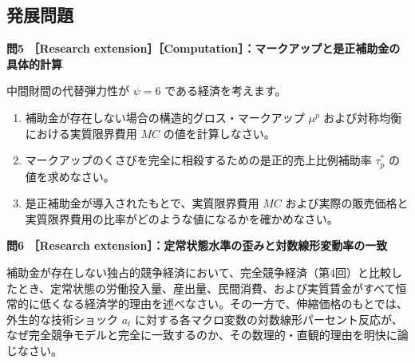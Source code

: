 \documentclass[
  japanese,
  lualatex,
  ja=standard,
  12pt,
  a4paper]{ltjsarticle}
\providecommand{\tightlist}{%
  \setlength{\itemsep}{0pt}\setlength{\parskip}{0pt}}
\begin{document}
\subsection{発展問題}\label{ux767aux5c55ux554fux984c}

\textbf{問5 ［Research
extension］［Computation］：マークアップと是正補助金の具体的計算}

中間財間の代替弾力性が \(\psi = 6\) である経済を考えます。

\begin{enumerate}
\def\labelenumi{\arabic{enumi}.}
\tightlist
\item
  補助金が存在しない場合の構造的グロス・マークアップ \(\mu^p\)
  および対称均衡における実質限界費用 \(MC\) の値を計算しなさい。
\item
  マークアップのくさびを完全に相殺するための是正的売上比例補助率
  \(\tau_p^*\) の値を求めなさい。
\item
  是正補助金が導入されたもとで、実質限界費用 \(MC\)
  および実際の販売価格と実質限界費用の比率がどのような値になるかを確かめなさい。
\end{enumerate}

\textbf{問6 ［Research
extension］：定常状態水準の歪みと対数線形変動率の一致}

補助金が存在しない独占的競争経済において、完全競争経済（第4回）と比較したとき、定常状態の労働投入量、産出量、民間消費、および実質賃金がすべて恒常的に低くなる経済学的理由を述べなさい。その一方で、伸縮価格のもとでは、外生的な技術ショック
\(a_t\)
に対する各マクロ変数の対数線形パーセント反応が、なぜ完全競争モデルと完全に一致するのか、その数理的・直観的理由を明快に論じなさい。
\end{document}
